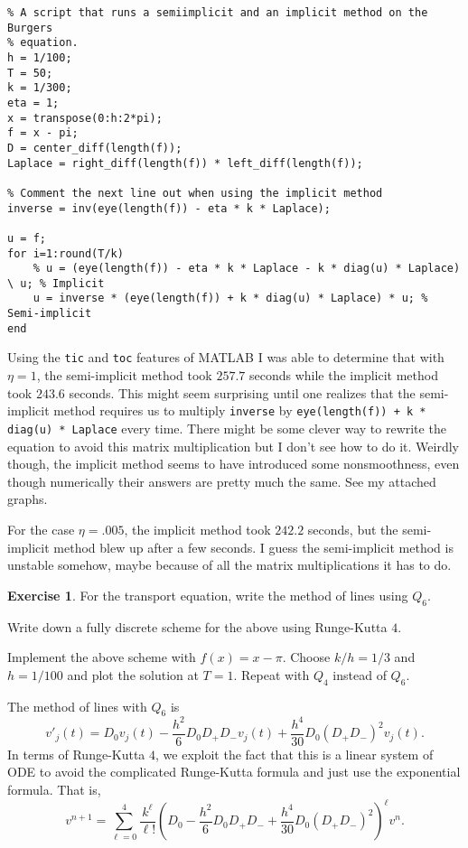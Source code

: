 \documentclass[10pt]{article}
\theoremstyle{definition}
\newtheorem{exer}{Exercise}
\begin{document}
\begin{verbatim}
% A script that runs a semiimplicit and an implicit method on the Burgers
% equation.
h = 1/100;
T = 50;
k = 1/300;
eta = 1;
x = transpose(0:h:2*pi);
f = x - pi;
D = center_diff(length(f));
Laplace = right_diff(length(f)) * left_diff(length(f));

% Comment the next line out when using the implicit method
inverse = inv(eye(length(f)) - eta * k * Laplace);

u = f;
for i=1:round(T/k)
    % u = (eye(length(f)) - eta * k * Laplace - k * diag(u) * Laplace) \ u; % Implicit
    u = inverse * (eye(length(f)) + k * diag(u) * Laplace) * u; % Semi-implicit
end
\end{verbatim}

Using the \texttt{tic} and \texttt{toc} features of MATLAB I was able to determine that with $\eta = 1$, the semi-implicit method took $257.7$ seconds while the implicit method took $243.6$ seconds.
This might seem surprising until one realizes that the semi-implicit method requires us to multiply \texttt{inverse} by \texttt{eye(length(f)) + k * diag(u) * Laplace} every time.
There might be some clever way to rewrite the equation to avoid this matrix multiplication but I don't see how to do it.
Weirdly though, the implicit method seems to have introduced some nonsmoothness, even though numerically their answers are pretty much the same. See my attached graphs.

For the case $\eta = .005$, the implicit method took $242.2$ seconds, but the semi-implicit method blew up after a few seconds.
I guess the semi-implicit method is unstable somehow, maybe because of all the matrix multiplications it has to do.

\begin{exer}
For the transport equation, write the method of lines using $Q_6$.

Write down a fully discrete scheme for the above using Runge-Kutta $4$.

Implement the above scheme with $f(x) = x - \pi$.
Choose $k/h = 1/3$ and $h = 1/100$ and plot the solution at $T = 1$.
Repeat with $Q_4$ instead of $Q_6$.
\end{exer}

The method of lines with $Q_6$ is
$$v'_j(t) = D_0 v_j(t) - \frac{h^2}{6} D_0 D_+ D_- v_j(t) + \frac{h^4}{30} D_0 (D_+ D_-)^2 v_j(t).$$
In terms of Runge-Kutta $4$, we exploit the fact that this is a linear system of ODE to avoid the complicated Runge-Kutta formula and just use the exponential formula.
That is,
$$v^{n+1} = \sum_{\ell=0}^4 \frac{k^\ell}{\ell!} \left(D_0 - \frac{h^2}{6} D_0 D_+ D_- + \frac{h^4}{30} D_0 (D_+ D_-)^2\right)^\ell v^n.$$
\end{document}
